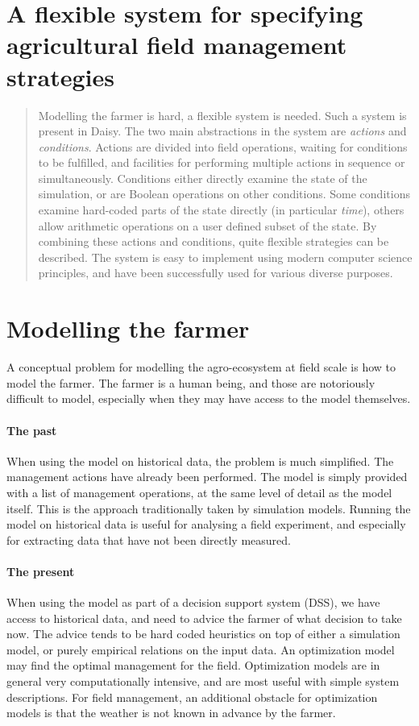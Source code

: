\documentclass[a4paper]{article}
\begin{document}
\section*{A flexible system for specifying agricultural field management strategies}

\begin{abstract}
  Modelling the farmer is hard, a flexible system is needed.  Such a
  system is present in Daisy.  The two main abstractions in the system
  are \emph{actions} and \emph{conditions}. Actions are divided into
  field operations, waiting for conditions to be fulfilled, and
  facilities for performing multiple actions in sequence or
  simultaneously.  Conditions either directly examine the state of the
  simulation, or are Boolean operations on other conditions.  Some
  conditions examine hard-coded parts of the state directly (in
  particular \emph{time}), others allow arithmetic operations on a
  user defined subset of the state.  By combining these actions and
  conditions, quite flexible strategies can be described.  The system
  is easy to implement using modern computer science principles, and
  have been successfully used for various diverse purposes.
\end{abstract}


\section{Modelling the farmer}

A conceptual problem for modelling the agro-ecosystem at field scale
is how to model the farmer.  The farmer is a human being, and those
are notoriously difficult to model, especially when they may have
access to the model themselves.

\paragraph{The past} When using the model on historical data, the
problem is much simplified.  The management actions have already been
performed.  The model is simply provided with a list of management
operations, at the same level of detail as the model itself.  This is
the approach traditionally taken by simulation models.  Running the
model on historical data is useful for analysing a field experiment, and
especially for extracting data that have not been directly measured.

\paragraph{The present} When using the model as part of a decision
support system (DSS), we have access to historical data, and need to
advice the farmer of what decision to take now.  The advice tends to
be hard coded heuristics on top of either a simulation model, or
purely empirical relations on the input data.  An optimization model
may find the optimal management for the field.  Optimization models
are in general very computationally intensive, and are most useful
with simple system descriptions.  For field management, an additional
obstacle for optimization models is that the weather is not known in
advance by the farmer.
\end{document}
